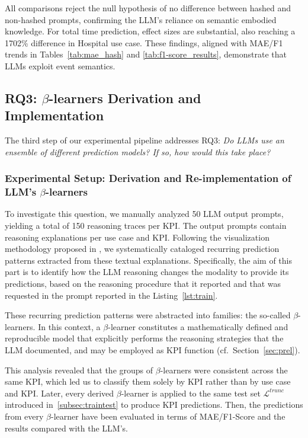 \documentclass[manuscript,screen,review]{acmart}
\newcommand{\ML}{\mathcal{L}}
\begin{document}
All comparisons reject the null hypothesis of no difference between hashed and non-hashed prompts, confirming the LLM's reliance on semantic embodied knowledge. For total time prediction, effect sizes are substantial, also reaching a 1702\% difference in Hospital use case. These findings, aligned with MAE/F1 trends in Tables~\ref{tab:mae_hash} and \ref{tab:f1-score_results}, demonstrate that LLMs exploit event semantics. 



\subsection{RQ3: $\beta$-learners Derivation and Implementation}\label{subsec:rq3}

The third step of our experimental pipeline addresses RQ3: \textit{Do LLMs use an ensemble of different prediction models? If so, how would this take place?}

\subsubsection{Experimental Setup: Derivation and Re-implementation of LLM's $\beta$-learners}

To investigate this question, we manually analyzed 50 LLM output prompts, yielding a total of 150 reasoning traces per KPI. The output prompts contain reasoning explanations per use case and KPI. Following the visualization methodology proposed in \cite{zhou2025landscapethoughtsvisualizingreasoning}, we systematically cataloged recurring prediction patterns extracted from these textual explanations. Specifically, the aim of this part is to identify how the LLM reasoning changes the modality to provide its predictions, based on the reasoning procedure that it reported and that was requested in the prompt reported in the Listing~\ref{lst:train}.

These recurring prediction patterns were abstracted into families: the so-called $\beta$-learners. In this context, a $\beta$-learner constitutes a mathematically defined and reproducible model that explicitly performs the reasoning strategies that the LLM documented, and may be employed as KPI function (cf.\ Section~\ref{sec:prel}). %

This analysis revealed that the groups of $\beta$-learners were consistent across the same KPI, which led us to classify them solely by KPI rather than by use case and KPI. Later, every derived $\beta$-learner is applied to the same test set $\ML^{trunc}$ introduced in~\ref{subsec:traintest} to produce KPI predictions. Then, the predictions from every $\beta$-learner have been evaluated in terms of MAE/F1-Score and the results compared with the LLM's. 
\end{document}
